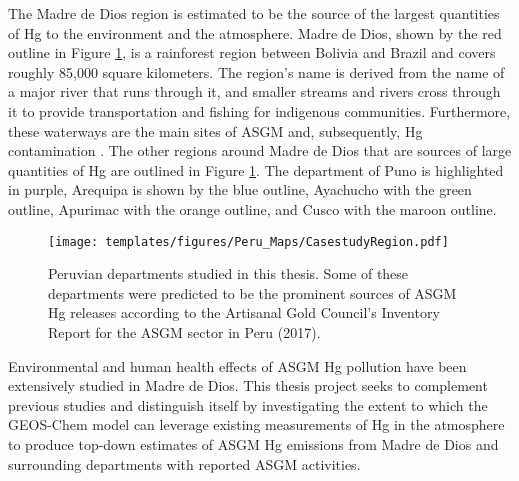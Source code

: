 \begin{flushleft}
The Madre de Dios region is estimated to be the source of the largest quantities of Hg to the environment and the atmosphere\cite{agc_reporte_2017}. Madre de Dios, shown by the red outline in Figure \ref{fig:PeruCS}, is a rainforest region between Bolivia and Brazil and covers roughly 85,000 square kilometers. The region's name is derived from the name of a major river that runs through it, and smaller streams and rivers cross through it to provide transportation and fishing for indigenous communities. Furthermore, these waterways are the main sites of ASGM and, subsequently, Hg contamination \cite{ashe_elevated_2012,agc_reporte_2017}. The other regions around Madre de Dios that are sources of large quantities of Hg are outlined in Figure \ref{fig:PeruCS}. The department of Puno is highlighted in purple, Arequipa is shown by the blue outline, Ayachucho with the green outline, Apurimac with the orange outline, and Cusco with the maroon outline.
\begin{figure}[H]
  \texttt{[image: templates/figures/Peru\_Maps/CasestudyRegion.pdf]}
  \centering
  \caption[Peruvian departments studied in this thesis]{Peruvian departments studied in this thesis. Some of these departments were predicted to be the prominent sources of ASGM Hg releases according to the Artisanal Gold Council's  Inventory Report for the ASGM sector in Peru (2017)\cite{agc_reporte_2017}. }
  \label{fig:PeruCS}
\end{figure}
\FloatBarrier

Environmental and human health effects of ASGM Hg pollution have been extensively studied in Madre de Dios. This thesis project seeks to complement previous studies and distinguish itself  by investigating the extent to which the GEOS-Chem model can leverage existing measurements of Hg in the atmosphere to produce top-down estimates of ASGM Hg emissions from Madre de Dios and surrounding departments with reported ASGM activities.

\end{flushleft}
